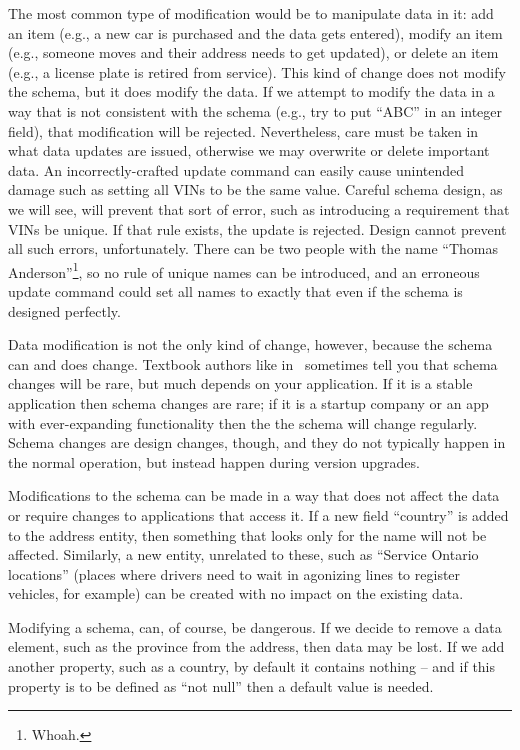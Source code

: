 The most common type of modification would be to manipulate data in it: add an item (e.g., a new car is purchased and the data gets entered), modify an item (e.g., someone moves and their address needs to get updated), or delete an item (e.g., a license plate is retired from service). This kind of change does not modify the schema, but it does modify the data. If we attempt to modify the data in a way that is not consistent with the schema (e.g., try to put ``ABC'' in an integer field), that modification will be rejected. Nevertheless, care must be taken in what data updates are issued, otherwise we may overwrite or delete important data. An incorrectly-crafted update command can easily cause unintended damage such as setting all VINs to be the same value. Careful schema design, as we will see, will prevent that sort of error, such as introducing a requirement that VINs be unique. If that rule exists, the update is rejected. Design cannot prevent all such errors, unfortunately. There can be two people with the name ``Thomas Anderson''\footnote{Whoah.}, so no rule of unique names can be introduced, and an erroneous update command could set all names to exactly that even if the schema is designed perfectly.

Data modification is not the only kind of change, however, because the schema can and does change. Textbook authors like in~\cite{fds} sometimes tell you that schema changes will be rare, but much depends on your application. If it is a stable application then schema changes are rare; if it is a startup company or an app with ever-expanding functionality then the the schema will change regularly. Schema changes are design changes, though, and they do not typically happen in the normal operation, but instead happen during version upgrades. 

Modifications to the schema can be made in a way that does not affect the data or require changes to applications that access it. If a new field ``country'' is added to the address entity, then something that looks only for the name will not be affected. Similarly, a new entity, unrelated to these, such as ``Service Ontario locations'' (places where drivers need to wait in agonizing lines to register vehicles, for example) can be created with no impact on the existing data.

Modifying a schema, can, of course, be dangerous. If we decide to remove a data element, such as the province from the address, then data may be lost. If we add another property, such as a country, by default it contains nothing -- and if this property is to be defined as ``not null'' then a default value is needed.

